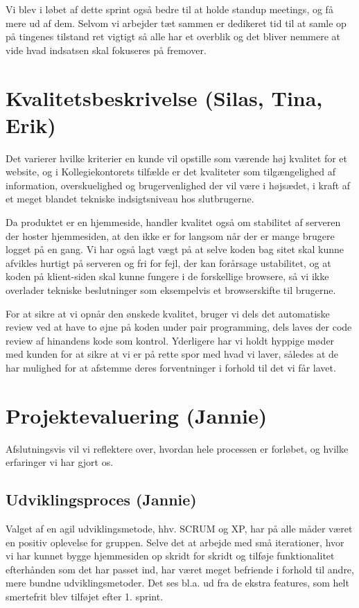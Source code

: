 \documentclass[12pt, a4paper]{report}
\begin{document}
Vi blev i løbet af dette sprint også bedre til at holde standup meetings, og få mere ud af dem. Selvom vi arbejder tæt sammen er dedikeret tid til at samle op på tingenes tilstand ret vigtigt så alle har et overblik og det bliver nemmere at vide hvad indsatsen skal fokuseres på fremover.

\section{Kvalitetsbeskrivelse (Silas, Tina, Erik)}
Det varierer hvilke kriterier en kunde vil opstille som værende høj kvalitet for et website, og i Kollegiekontorets tilfælde er det kvaliteter som tilgængelighed af information, overskuelighed og brugervenlighed der vil være i højsædet, i kraft af et meget blandet tekniske indsigtsniveau hos slutbrugerne.


Da produktet er en hjemmeside, handler kvalitet også om stabilitet af serveren der hoster hjemmesiden, at den ikke er for langsom når der er mange brugere logget på en gang. Vi har også lagt vægt på at selve koden bag sitet skal kunne afvikles hurtigt på serveren og fri for fejl, der kan forårsage ustabilitet, og at koden på klient-siden skal kunne fungere i de forskellige browsere, så vi ikke overlader tekniske beslutninger som eksempelvis et browserskifte til brugerne.


For at sikre at vi opnår den ønskede kvalitet, bruger vi dels det automatiske review ved at have to øjne på koden under pair programming, dels laves der code review af hinandens kode som kontrol. Yderligere har vi holdt hyppige møder med kunden for at sikre at vi er på rette spor med hvad vi laver, således at de har mulighed for at afstemme deres forventninger i forhold til det vi får lavet.


\section{Projektevaluering (Jannie)}
Afslutningsvis vil vi reflektere over, hvordan hele processen er forløbet, og hvilke erfaringer vi har gjort os.

\subsection{Udviklingsproces (Jannie)}
Valget af en agil udviklingsmetode, hhv. SCRUM og XP, har på alle måder været en positiv oplevelse for gruppen. Selve det at arbejde med små iterationer, hvor vi har kunnet bygge hjemmesiden op skridt for skridt og tilføje funktionalitet efterhånden som det har passet ind, har været meget befriende i forhold til andre, mere bundne udviklingsmetoder. Det ses bl.a. ud fra de ekstra features, som helt smertefrit blev tilføjet efter 1. sprint.
\end{document}
